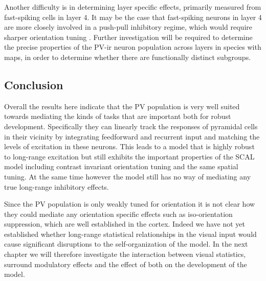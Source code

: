 Another difficulty is in determining layer specific effects,
\cite{Cardin2007} primarily measured from fast-spiking cells in layer
4. It may be the case that fast-spiking neurons in layer 4 are more
closely involved in a push-pull inhibitory regime, which would require
sharper orientation tuning \citep{Hirsch2003, Hirsch2006a}. Further
investigation will be required to determine the precise properties of
the PV-ir neuron population across layers in species with maps, in
order to determine whether there are functionally distinct subgroups.

\subsection{Conclusion}

Overall the results here indicate that the PV population is very well
suited towards mediating the kinds of tasks that are important both
for robust development. Specifically they can linearly track the
responses of pyramidal cells in their vicinity by integrating
feedforward and recurrent input and matching the levels of excitation
in these neurons. This leads to a model that is highly robust to
long-range excitation but still exhibits the important properties of
the SCAL model including contrast invariant orientation tuning and the
same spatial tuning. At the same time however the model still has no
way of mediating any true long-range inhibitory effects.

Since the PV population is only weakly tuned for orientation it is not
clear how they could mediate any orientation specific effects such as
iso-orientation suppression, which are well established in the
cortex. Indeed we have not yet established whether long-range
statistical relationships in the visual input would cause significant
disruptions to the self-organization of the model. In the next chapter
we will therefore investigate the interaction between visual
statistics, surround modulatory effects and the effect of both on the
development of the model.
